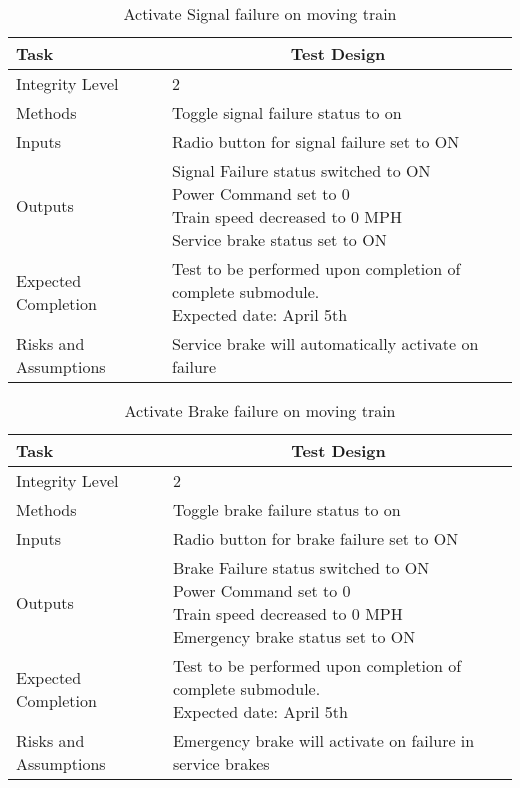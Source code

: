 \documentclass[]{article}
\begin{document}
	\begin{table}[H]
		\centering
		\caption{Activate Signal failure on moving train}
		\begin{tabular}{|l|l|}
			\hline
			Task & \multicolumn{1}{c|}{Test Design} \\ \hline
			Integrity Level & 2 \\ \hline
			Methods & Toggle signal failure status to on  \\ \hline
			Inputs &  Radio button for signal failure set to ON \\ \hline
			Outputs & \parbox[t]{10cm}{ Signal Failure status switched to ON\\ Power Command set to 0\\ Train speed decreased to 0 MPH\\ Service brake status set to ON  }\\ \hline
			Expected Completion & \parbox[t]{10cm}{Test to be performed upon completion of complete submodule.\\ Expected date: April 5th}\\ \hline
			Risks and Assumptions & Service brake will automatically activate on failure\\ \hline
		\end{tabular}
	\end{table}

	\begin{table}[H]
		\centering
		\caption{Activate Brake failure on moving train}
		\begin{tabular}{|l|l|}
			\hline
			Task & \multicolumn{1}{c|}{Test Design} \\ \hline
			Integrity Level & 2 \\ \hline
			Methods & Toggle brake failure status to on  \\ \hline
			Inputs &  Radio button for brake failure set to ON \\ \hline
			Outputs & \parbox[t]{10cm}{ Brake Failure status switched to ON\\ Power Command set to 0\\ Train speed decreased to 0 MPH\\ Emergency brake status set to ON  }\\ \hline
			Expected Completion & \parbox[t]{10cm}{Test to be performed upon completion of complete submodule.\\ Expected date: April 5th}\\ \hline
			Risks and Assumptions & Emergency brake will activate on failure in service brakes\\ \hline
		\end{tabular}
	\end{table}
\end{document}
